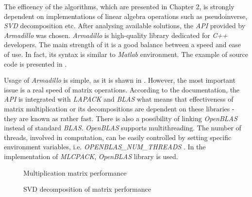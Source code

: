 The efficency of the algorithms, which are presented in Chapter 2, is strongly dependent on implementations of linear algebra operations such as pseudoinverse, \textit{SVD} decomposition etc. After analysing available solutions, the \textit{API} provided by \textit{Armadillo} was chosen. \textit{Armadillo} is high-quality library dedicated for \textit{C++} developers. The main strength of it is a good balance between a speed and ease of use. In fact, its syntax is similar to \textit{Matlab} environment. The example of source code is presented in .

Usage of \textit{Armadillo} is simple, as it is shawn in . However, the most important issue is a real speed of matrix operations. According to the documentation, the \textit{API} is integrated with \textit{LAPACK} and \textit{BLAS} what means that effectiveness of matrix multiplication or its decompositions are dependent on these libraries - they are known as rather fast. There is also a possibility of linking \textit{OpenBLAS} instead of standard \textit{BLAS}. \textit{OpenBLAS} supports multithreading. The number of threads, involved in computation, can be easily controlled by setting specific environment variables, i.e. \textit{OPENBLAS\_NUM\_THREADS} \cite{Blas}. In the implementation of \textit{MLCPACK}, \textit{OpenBLAS} library is used.    

\begin{figure}[h]
\centering
\caption{Multiplication matrix performance}
\label{fig:mulperf}
\end{figure}

\begin{figure}
\centering
\caption{SVD decomposition of matrix performance}
\label{fig:svdperf}
\end{figure}


